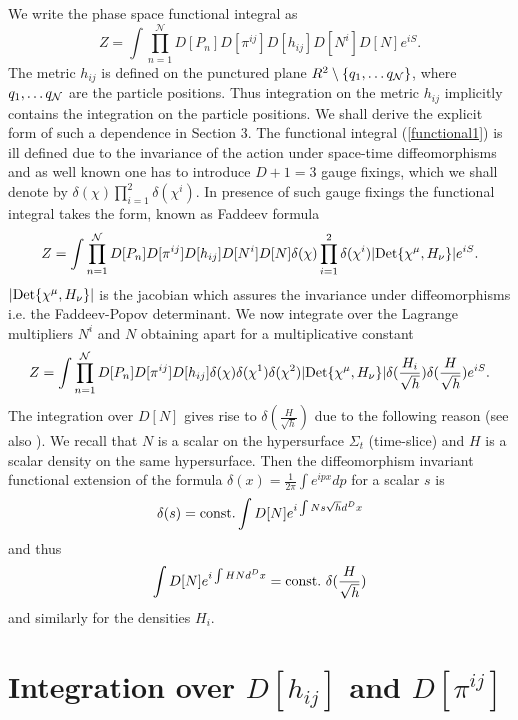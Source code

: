 \documentclass[a4paper,12pt]{article}
\begin{document}
We write the phase space functional integral as
\begin{equation}\label{functional1}
Z= \int 
\prod_{n=1}^{\mathcal{N}}D[P_n]
D[\pi^{ij}] D[h_{ij}] D[N^i] D[N] e^{i S}.
\end{equation}
The metric $h_{ij}$ is defined on the punctured plane
$R^2\setminus\{q_1,\dots q_{\cal N}\}$, where $q_1,\dots q_{\cal N}$ are
the particle positions. Thus integration on the metric
$h_{ij}$ implicitly contains the integration on the particle
positions. We shall derive the explicit form of such a dependence in
Section 3.
The functional integral (\ref{functional1}) is ill defined due to the
invariance of the action under space-time diffeomorphisms and as well
known one has to introduce $D+1=3$ gauge fixings, which we shall denote
by $\displaystyle {\delta(\chi)\prod_{i=1}^2\delta(\chi^i)}$. In
presence of such gauge fixings the functional integral takes the
form, known as Faddeev formula \cite{henneaux}
\begin{equation}
Z= \int 
\prod_{n=1}^{\mathcal{N}}D[P_n]
D[\pi^{ij}] D[h_{ij}] D[N^i] D[N] \delta(\chi)\prod_{i=1}^2\delta(\chi^i)
|{\rm Det}\{\chi^\mu, H_\nu\}| e^{i S}.
\end{equation}
$|{\rm Det}\{\chi^\mu, H_\nu\}|$ is the jacobian which assures the invariance 
under diffeomorphisms i.e. the Faddeev-Popov determinant.
We now integrate over the Lagrange multipliers $N^i$ and
$N$ obtaining apart for a multiplicative constant
\begin{equation}
Z= \int 
\prod_{n=1}^{\mathcal{N}}D[P_n]
D[\pi^{ij}] D[h_{ij}] \delta(\chi)\delta(\chi^1)\delta(\chi^2)
|{\rm Det}\{\chi^\mu, H_\nu\}|
\delta(\frac{H_i}{\sqrt{h}})\delta(\frac{H}{\sqrt{h}}) 
e^{i S}.
\end{equation}
The integration over $D[N]$ gives rise to $\delta(\frac{H}{\sqrt{h}})$
due to the following reason (see also \cite{carlip}). We recall that $N$ is a
scalar on the hypersurface $\Sigma_t$ (time-slice) and $H$ is a scalar
density on the same hypersurface.  Then the diffeomorphism invariant functional
extension of the formula $\delta(x)= \frac{1}{2\pi}\int e^{ipx}dp$ for
a scalar $s$ is
$$
\delta(s)={\rm const.} \int D[N] e^{i\int Ns\sqrt{h}d^Dx}
$$
and thus
$$
 \int D[N] e^{i\int HNd^Dx}={\rm const.}~\delta(\frac{H}{\sqrt{h}})
$$
and similarly for the densities $H_i$.



\noindent

\section{Integration over $D[h_{ij}]$ and
$D[\pi^{ij}]$}\label{IntegrationDhDpi}  
\end{document}
